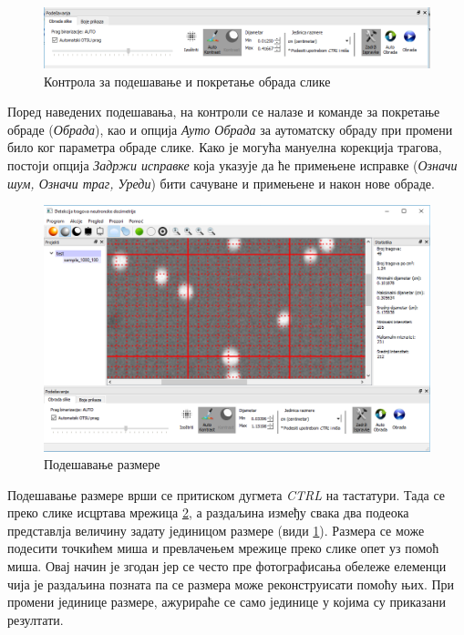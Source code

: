 \documentclass[11pt,a4paper,serbian,oneside]{book}
\begin{document}
\begin{figure}[H]
\begin{center}
\includegraphics[width=150mm]{images/processing.png}
\end{center}
\caption{Контрола за подешавање и покретање обрада слике}
\label{fig:processing}
\end{figure}

Поред наведених подешавања, на контроли се налазе и команде за покретање об\-ра\-де (\textit{Обрада}), као и опција \textit{Ауто Обрада} за аутоматску обраду при промени било ког параметра обраде слике. Како је могућа мануелна корекција трагова, постоји опција \textit{Задржи исправке} која указује да ће примењене исправке (\textit{Означи шум, Означи траг, Уреди}) бити сачуване и примењене и након нове обраде.

\begin{figure}[H]
\begin{center}
\includegraphics[width=150mm]{images/ratio.png}
\end{center}
\caption{Подешавање размере}
\label{fig:ratio}
\end{figure}

Подешавање размере врши се притиском дугмета \textit{CTRL} на тастатури. Тада се преко слике исцртава мрежица \ref{fig:ratio}, а раздаљина између свака два подеока представлја величину задату јединицом размере (види \ref{fig:processing}). Размера се може подесити точкићем миша и пре\-вла\-че\-њем мрежице преко слике опет уз помоћ миша. Овај начин је згодан јер се често пре фотографисања обележе елеменци чија је раздаљина позната па се размера може реконструисати помоћу њих. При промени јединице размере, ажурираће се само јединице у којима су приказани резултати.
\end{document}

